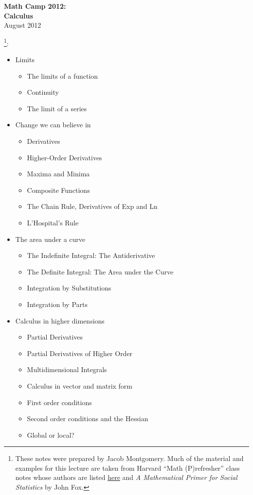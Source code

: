 \documentclass[11pt]{article}
\newcommand{\bi}{\begin{itemize}}
\newcommand{\ei}{\end{itemize}}
\newcommand{\noi}{\noindent}
\begin{document}
\pagestyle{myheadings}
\parskip=6pt
\thispagestyle{empty}
\renewcommand{\thefootnote}{\fnsymbol{footnote}}

\begin{centering}
{\Large \bf Math Camp 2012:\\[9pt]
 Calculus}\\[18pt]
August 2012\\[36pt]
\end{centering}


\noi {\bf Topics}\footnote{These notes were prepared by Jacob Montgomery. Much of the material and examples for
this lecture are taken from Harvard ``Math (P)refresher'' class notes
whose authors are listed
\href{http://people.hmdc.harvard.edu/~mathpre/mathnotes/lectures/index.html}{here}
and \textit{A Mathematical Primer for Social Statistics} by John Fox.}:
\bi
\item Limits
\bi
\item The limits of a function
\item Continuity
\item The limit of a series
\ei
\item Change we can believe in
\bi
\item Derivatives 
\item Higher-Order Derivatives 
\item  Maxima and Minima 
\item  Composite Functions 
\item  The Chain Rule,  Derivatives of Exp and Ln 
\item  L'Hospital's Rule
\ei
\item The area under a curve
\bi
\item The Indefinite Integral: The Antiderivative 
\item The Definite Integral: The Area under the Curve 
\item Integration by Substitutions 
\item Integration by Parts
\ei
\item Calculus in higher dimensions
\bi
\item Partial Derivatives
\item Partial Derivatives of Higher Order
\item Multidimensional Integrals
\item Calculus in vector and matrix form
\item First order conditions
\item Second order conditions and the Hessian
\item Global or local?
\ei
\ei
\end{document}
